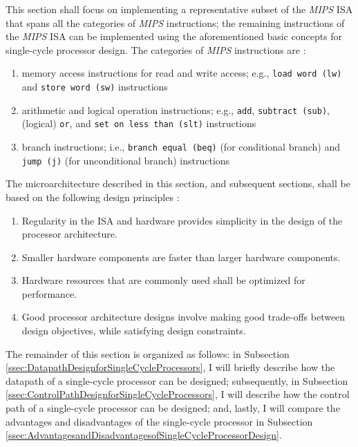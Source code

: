 This section shall focus on implementing a representative subset of the {\it MIPS} ISA that spans all the categories of {\it MIPS} instructions; the remaining instructions of the {\it MIPS} ISA can be implemented using the aforementioned basic concepts for single-cycle processor design. The categories of {\it MIPS} instructions are \cite{Patterson2005}: \vspace{-0.3cm}
\begin{enumerate} \itemsep -4pt
\item memory access instructions for read and write access; e.g., {\tt load word (lw)} and {\tt store word (sw)} instructions
\item arithmetic and logical operation instructions; e.g., {\tt add}, {\tt subtract (sub)}, (logical) {\tt or}, and {\tt set on less than (slt)} instructions
\item branch instructions; i.e., {\tt branch equal (beq)} (for conditional branch) and {\tt jump (j)} (for unconditional branch) instructions
\end{enumerate}

The microarchitecture described in this section, and subsequent sections, shall be based on the following design principles \cite{Patterson2012}: \vspace{-0.3cm}
\begin{enumerate} \itemsep -4pt
\item Regularity in the ISA and hardware provides simplicity in the design of the processor architecture.
\item Smaller hardware components are faster than larger hardware components.
\item Hardware resources that are commonly used shall be optimized for performance.
\item Good processor architecture designs involve making good trade-offs between design objectives, while satisfying design constraints.
\end{enumerate}

The remainder of this section is organized as follows: in Subsection \ref{ssec:DatapathDesignforSingleCycleProcessors}, I will briefly describe how the datapath of a single-cycle processor can be designed; subsequently, in Subsection \ref{ssec:ControlPathDesignforSingleCycleProcessors}, I will describe how the control path of a single-cycle processor can be designed; and, lastly, I will compare the advantages and disadvantages of the single-cycle processor in Subsection \ref{ssec:AdvantagesandDisadvantagesofSingleCycleProcessorDesign}.





